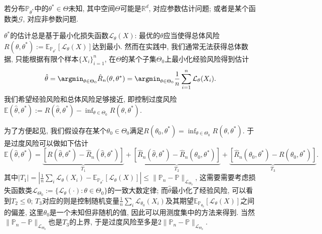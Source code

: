  
\begin{example}
若分布$\mathbb{P}_{\theta^*}$中的$\theta^* \in \Theta$未知, 其中空间$\Theta$可能是$\mathbb{R}^d$, 对应参数估计问题; 或者是某个函数类$\mathscr{G}$, 对应非参数问题. 

$\theta^*$的估计总是基于最小化损失函数$\mathcal{L}_{\theta} (X)$: 最优的$\theta$应当使得总体风险$R(\theta, \theta^*) := \mathbb{E}_{\mathbb{P}_{\theta^*}}[\mathcal{L}_{\theta} (X)]$达到最小. 
然而在实践中, 我们通常无法获得总体数据, 只能根据有限个样本$\{ X_i \}_{i=1}^n$, 在$\Theta$的某个子集$\Theta_0$上最小化经验风险得到估计
\begin{equation*}
	\hat \theta 
	= \argmin_{\theta \in \Theta_0} \hat R_n (\theta, \theta^*) 
	= \argmin_{\theta \in \Theta_0} \frac{1}{n} \sum_{i=1}^n \mathcal{L}_{\theta} (X_i). 
\end{equation*}
我们希望经验风险和总体风险足够接近, 即控制过度风险$\mathbb{E}(\hat \theta, \theta^*) := R(\hat \theta, \theta^*) - \inf_{\theta \in \Theta_0} R(\theta, \theta^*)$. 

为了方便起见, 我们假设存在某个$\theta_0 \in \Theta_0$满足$R(\theta_0, \theta^*) = \inf_{\theta \in \Theta_0}R(\theta, \theta^*)$. 
于是过度风险可以做如下估计
\begin{equation*}
	\mathbb{E}(\hat \theta, \theta^*)
	= \underbrace{\left[ R(\hat \theta, \theta^*) - \hat R_n(\hat \theta, \theta^*) \right]}_{T_1}
	+ \underbrace{\left[ \hat R_n(\hat \theta, \theta^*) - \hat R_n(\theta_0, \theta^*) \right]}_{T_2}
	+ \underbrace{\left[ \hat R_n(\theta_0, \theta^*) - R(\theta_0, \theta^*) \right]}_{T_3}. 
\end{equation*}
其中$|T_1| = \left| \frac{1}{n} \sum_i \mathcal{L}_{\theta} (X_i) - \mathbb{E}_{\mathbb{P}_{\theta^*}}[\mathcal{L}_{\theta} (X)] \right| \leq \|\mathbb{P}_n - \mathbb{P}\|_{\mathcal{L}_{\Theta_0}}$, 这需要需要考虑损失函数类$\mathcal{L}_{\Theta_0} := \{ \mathcal{L}_{\theta}(\cdot) \colon \theta \in \Theta_0 \}$的一致大数定律; 
而$\hat \theta$最小化了经验风险, 可以看到$T_2 \leq 0$; 
$T_3$对应的则是控制随机变量$\frac{1}{n} \sum_i \mathcal{L}_{\theta_0}(X_i)$及其期望$\mathbb{E}_{\mathbb{P}_{\theta_0}}[\mathcal{L}_{\theta} (X)]$之间的偏差, 这里$\theta_0$是一个未知但非随机的值, 因此可以用测度集中的方法来得到. 
当然$\|\mathbb{P}_n - \mathbb{P}\|_{\mathcal{L}_{\Theta_0}}$也是$T_3$的上界, 于是过度风险至多是$2 \|\mathbb{P}_n - \mathbb{P}\|_{\mathcal{L}_{\Theta_0}}$. 
\end{example}

